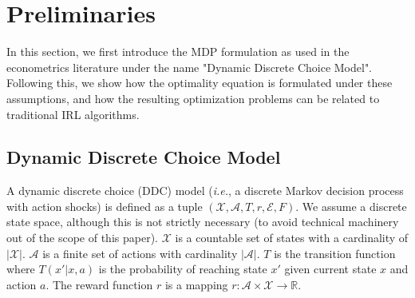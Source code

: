 \documentclass{article}
\begin{document}
\section{Preliminaries}

In this section, we first introduce the MDP formulation as used in the econometrics literature under the name "Dynamic Discrete Choice Model". Following this, we show how the optimality equation is formulated under these assumptions, and how the resulting optimization problems can be related to traditional IRL algorithms.

\subsection{Dynamic Discrete Choice Model}

A dynamic discrete choice (DDC) model (\emph{i.e.}, a discrete Markov decision process with action shocks) is defined as a tuple $(\mathcal{X,A}, T,r,\mathcal{E},F)$. 
We assume a discrete state space, although this is not strictly necessary (to avoid technical machinery out of the scope of this paper).
$\mathcal{X}$ is a countable set of states with a cardinality of $|\mathcal{X}|$. $\mathcal{A}$ is a finite set of actions with cardinality $|\mathcal{A}|$. $T$ is the transition function where $T(x'|x,a)$ is the probability of reaching state $x'$ given current state $x$ and action $a$. The reward function $r$ is a mapping $r:\mathcal{A}\times\mathcal{X}\rightarrow \mathbb{R}$.
\end{document}
